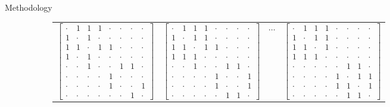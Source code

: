 \documentclass{article}
\begin{document}
\begin{section}{Methodology}
\begin{figure}
\begin{subfigure}[c]{1\textwidth}
    \end{subfigure}
    \begin{subfigure}[c]{1\textwidth}
        \begin{tabular}{llll}
            $\begin{bmatrix}
                \cdot & 1 & 1 & 1 & \cdot & \cdot & \cdot & \cdot\\
                1 & \cdot & 1 & \cdot & \cdot & \cdot & \cdot & \cdot\\
                1 & 1 & \cdot & 1 & 1 & \cdot & \cdot & \cdot\\
                1 & \cdot & 1 & \cdot & \cdot & \cdot & \cdot & \cdot\\
                \cdot & \cdot & 1 & \cdot & \cdot & 1 & 1 & \cdot\\
                \cdot & \cdot & \cdot & \cdot & 1 & \cdot & \cdot & \cdot\\
                \cdot & \cdot & \cdot & \cdot & 1 & \cdot & \cdot & 1\\
                \cdot & \cdot & \cdot & \cdot & \cdot & \cdot & 1 & \cdot
            \end{bmatrix}$
            &
            $\begin{bmatrix}
                \cdot & 1 & 1 & 1 & \cdot & \cdot & \cdot & \cdot\\
                1 & \cdot & 1 & 1 & \cdot & \cdot & \cdot & \cdot\\
                1 & 1 & \cdot & 1 & 1 & \cdot & \cdot & \cdot\\
                1 & 1 & 1 & \cdot & \cdot & \cdot & \cdot & \cdot\\
                \cdot & \cdot & 1 & \cdot & \cdot & 1 & 1 & \cdot\\
                \cdot & \cdot & \cdot & \cdot & 1 & \cdot & \cdot & 1\\
                \cdot & \cdot & \cdot & \cdot & 1 & \cdot & \cdot & 1\\
                \cdot & \cdot & \cdot & \cdot & \cdot & 1 & 1 & \cdot
            \end{bmatrix}$
            &
            $\cdots$
            &
            $\begin{bmatrix}
                \cdot & 1 & 1 & 1 & \cdot & \cdot & \cdot & \cdot\\
                1 & \cdot & 1 & 1 & \cdot & \cdot & \cdot & \cdot\\
                1 & 1 & \cdot & 1 & \cdot & \cdot & \cdot & \cdot\\
                1 & 1 & 1 & \cdot & \cdot & \cdot & \cdot & \cdot\\
                \cdot & \cdot & \cdot & \cdot & \cdot & 1 & 1 & \cdot\\
                \cdot & \cdot & \cdot & \cdot & 1 & \cdot & 1 & 1\\
                \cdot & \cdot & \cdot & \cdot & 1 & 1 & \cdot & 1\\
                \cdot & \cdot & \cdot & \cdot & \cdot & 1 & 1 & \cdot
            \end{bmatrix}$
            

\end{tabular}
\end{subfigure}
\end{figure}
\end{section}
\end{document}
